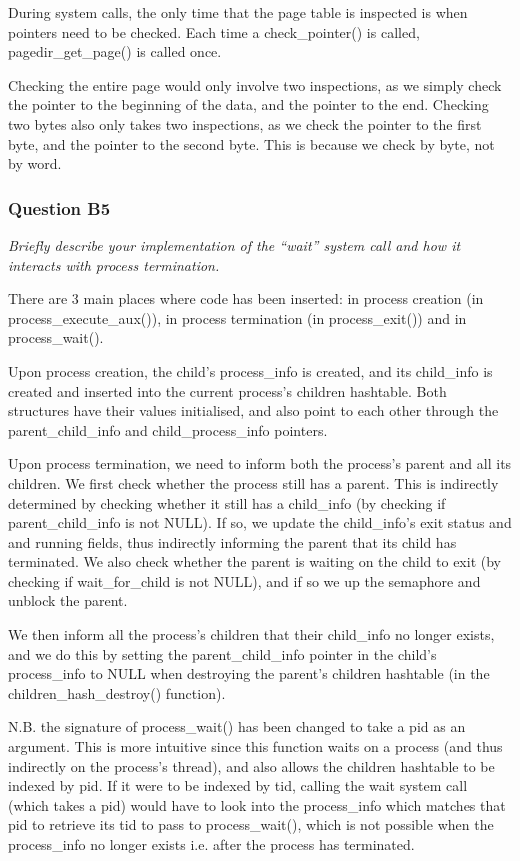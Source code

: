 During system calls, the only time that the page table is inspected is when
pointers need to be checked.  Each time a check\_pointer() is called,
pagedir\_get\_page() is called once.

Checking the entire page would only involve two inspections, as we simply check
the pointer to the beginning of the data, and the pointer to the end.  Checking
two bytes also only takes two inspections, as we check the pointer to the first
byte, and the pointer to the second byte. This is because we check by byte, not
by word.

\subsubsection*{Question B5} %
\textit{Briefly describe your implementation of the ``wait'' system call and how it interacts with process termination.}

There are 3 main places where code has been inserted: in process creation (in process\_execute\_aux()), in process termination (in process\_exit()) and in process\_wait().

Upon process creation, the child's process\_info is created, and its child\_info is created and inserted into the current process's children hashtable. Both structures have their values initialised, and also point to each other through the parent\_child\_info and child\_process\_info pointers.

Upon process termination, we need to inform both the process's parent and all its children. We first check whether the process still has a parent. This is indirectly determined by checking whether it still has a child\_info (by checking if parent\_child\_info is not NULL). If so, we update the child\_info's exit status and and running fields, thus indirectly informing the parent that its child has terminated. We also check whether the parent is waiting on the child to exit (by checking if wait\_for\_child is not NULL), and if so we up the semaphore and unblock the parent.

We then inform all the process's children that their child\_info no longer exists, and we do this by setting the parent\_child\_info pointer in the child's process\_info to NULL when destroying the parent's children hashtable (in the children\_hash\_destroy() function).

N.B. the signature of process\_wait() has been changed to take a pid as an argument. This is more intuitive since this function waits on a process (and thus indirectly on the process's thread), and also allows the children hashtable to be indexed by pid. If it were to be indexed by tid, calling the wait system call (which takes a pid) would have to look into the process\_info which matches that pid to retrieve its tid to pass to process\_wait(), which is not possible when the process\_info no longer exists i.e. after the process has terminated.

